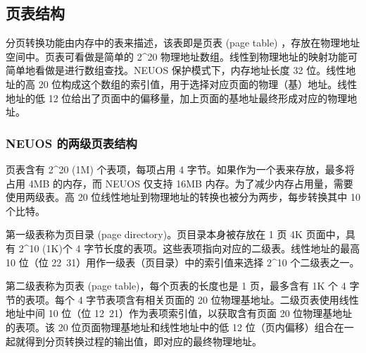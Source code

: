 \subsection{页表结构}

分页转换功能由内存中的表来描述，该表即是页表 (page table) ，存放在物理地址空间中。页表可看做是简单的 2\^{}20 物理地址数组。线性到物理地址的映射功能可简单地看做是进行数组查找。NEUOS 保护模式下，内存地址长度 32 位。线性地址的高 20 位构成这个数组的索引值，用于选择对应页面的物理（基）地址。线性地址的低 12 位给出了页面中的偏移量，加上页面的基地址最终形成对应的物理地址。

\subsubsection{NEUOS 的两级页表结构}

页表含有 2\^{}20 (1M) 个表项，每项占用 4 字节。如果作为一个表来存放，最多将占用 4MB 的内存，而 NEUOS 仅支持 16MB 内存。为了减少内存占用量，需要使用两级表。高 20 位线性地址到物理地址的转换也被分为两步，每步转换其中 10 个比特。

第一级表称为页目录 (page directory)。页目录本身被存放在 1 页 4K 页面中，具有 2\^{}10 (1K)个 4 字节长度的表项。这些表项指向对应的二级表。线性地址的最高 10 位（位 22~31）用作一级表（页目录）中的索引值来选择 2\^{}10 个二级表之一。

第二级表称为页表 (page table)，每个页表的长度也是 1 页，最多含有 1K 个 4 字节的表项。每个 4 字节表项含有相关页面的 20 位物理基地址。二级页表使用线性地址中间 10 位（位 12~21）作为表项索引值，以获取含有页面 20 位物理基地址的表项。该 20 位页面物理基地址和线性地址中的低 12 位（页内偏移）组合在一起就得到分页转换过程的输出值，即对应的最终物理地址。

